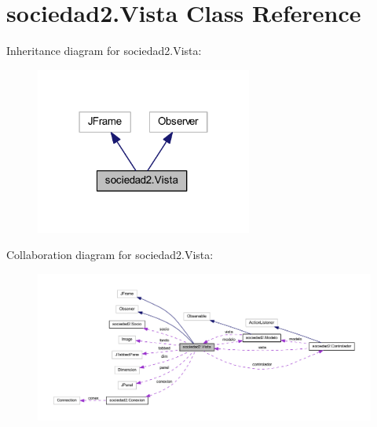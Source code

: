 \hypertarget{classsociedad2_1_1_vista}{}\section{sociedad2.\+Vista Class Reference}
\label{classsociedad2_1_1_vista}


Inheritance diagram for sociedad2.\+Vista\+:
\nopagebreak
\begin{figure}[H]
\begin{center}
\leavevmode
\includegraphics[width=202pt]{classsociedad2_1_1_vista__inherit__graph}
\end{center}
\end{figure}


Collaboration diagram for sociedad2.\+Vista\+:
\nopagebreak
\begin{figure}[H]
\begin{center}
\leavevmode
\includegraphics[width=350pt]{classsociedad2_1_1_vista__coll__graph}
\end{center}
\end{figure}

